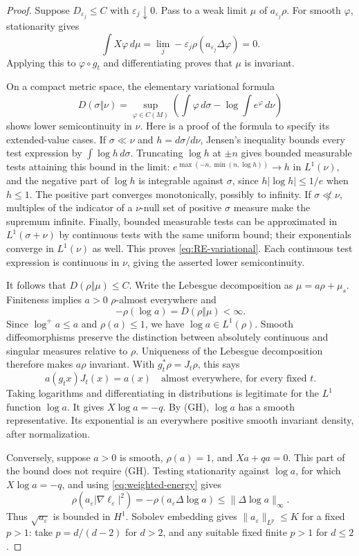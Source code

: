 \documentclass[11pt]{article}
\theoremstyle{definition}
\theoremstyle{remark}
\newcommand{\eps}{\varepsilon}
\begin{document}
\begin{proof}
Suppose $D_{\eps_j}\le C$ with $\eps_j\downarrow0$. Pass to a weak limit $\mu$ of $a_{\eps_j}\rho$. For smooth $\varphi$, stationarity gives
\[
 \int X\varphi\,d\mu
 =\lim_j-\eps_j\rho(a_{\eps_j}\Delta\varphi)=0.
\]
Applying this to $\varphi\circ g_t$ and differentiating proves that $\mu$ is invariant.

On a compact metric space, the elementary variational formula
\begin{equation}\label{eq:RE-variational}
 D(\sigma\Vert\nu)=\sup_{\varphi\in C(M)}
 \left(\int\varphi\,d\sigma-\log\int e^\varphi\,d\nu\right)
\end{equation}
shows lower semicontinuity in $\nu$. Here is a proof of the formula to specify its extended-value cases. If $\sigma\ll\nu$ and $h=d\sigma/d\nu$, Jensen's inequality bounds every test expression by $\int\log h\,d\sigma$. Truncating $\log h$ at $\pm n$ gives bounded measurable tests attaining this bound in the limit: $e^{\max(-n,\min(n,\log h))}\to h$ in $L^1(\nu)$, and the negative part of $\log h$ is integrable against $\sigma$, since $h|\log h|\le1/e$ when $h\le1$. The positive part converges monotonically, possibly to infinity. If $\sigma\not\ll\nu$, multiples of the indicator of a $\nu$-null set of positive $\sigma$ measure make the supremum infinite. Finally, bounded measurable tests can be approximated in $L^1(\sigma+\nu)$ by continuous tests with the same uniform bound; their exponentials converge in $L^1(\nu)$ as well. This proves \eqref{eq:RE-variational}. Each continuous test expression is continuous in $\nu$, giving the asserted lower semicontinuity.

It follows that $D(\rho\Vert\mu)\le C$. Write the Lebesgue decomposition as $\mu=a\rho+\mu_s$. Finiteness implies $a>0$ $\rho$-almost everywhere and
\[
 -\rho(\log a)=D(\rho\Vert\mu)<\infty.
\]
Since $\log^+a\le a$ and $\rho(a)\le1$, we have $\log a\in L^1(\rho)$. Smooth diffeomorphisms preserve the distinction between absolutely continuous and singular measures relative to $\rho$. Uniqueness of the Lebesgue decomposition therefore makes $a\rho$ invariant. With $g_t^*\rho=J_t\rho$, this says
\[
 a(g_tx)J_t(x)=a(x)\quad\text{almost everywhere, for every fixed }t.
\]
Taking logarithms and differentiating in distributions is legitimate for the $L^1$ function $\log a$. It gives $X\log a=-q$. By (GH), $\log a$ has a smooth representative. Its exponential is an everywhere positive smooth invariant density, after normalization.

Conversely, suppose $a>0$ is smooth, $\rho(a)=1$, and $Xa+qa=0$. This part of the bound does not require (GH). Testing stationarity against $\log a$, for which $X\log a=-q$, and using \eqref{eq:weighted-energy} gives
\begin{equation}\label{eq:fisher}
 \rho(a_\eps|\nabla\ell_\eps|^2)
 =-\rho(a_\eps\Delta\log a)\le\|\Delta\log a\|_\infty.
\end{equation}
Thus $\sqrt{a_\eps}$ is bounded in $H^1$. Sobolev embedding gives $\|a_\eps\|_{L^p}\le K$ for a fixed $p>1$: take $p=d/(d-2)$ for $d>2$, and any suitable fixed finite $p>1$ for $d\le2$.


\end{proof}
\end{document}
